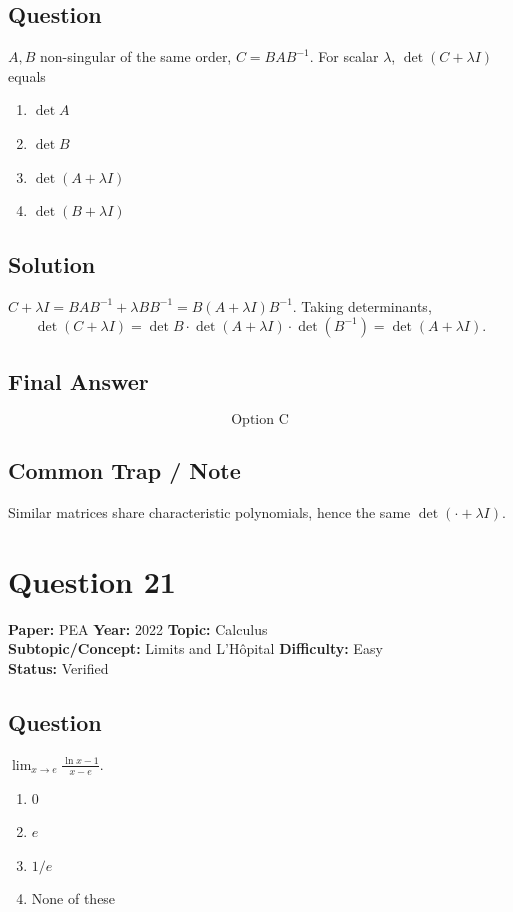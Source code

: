 \documentclass[11pt]{article}
\begin{document}
\subsection*{Question}
$A, B$ non-singular of the same order, $C = B A B^{-1}$. For scalar $\lambda$, $\det(C + \lambda I)$ equals
\begin{enumerate}[label=(\Alph*)]
\item $\det A$
\item $\det B$
\item $\det(A + \lambda I)$
\item $\det(B + \lambda I)$
\end{enumerate}

\subsection*{Solution}
$C + \lambda I = B A B^{-1} + \lambda B B^{-1} = B(A + \lambda I) B^{-1}$.
Taking determinants,
\[
\det(C + \lambda I) = \det B \cdot \det(A + \lambda I) \cdot \det(B^{-1}) = \det(A + \lambda I).
\]

\subsection*{Final Answer}
\[
\boxed{\text{Option C}}
\]

\subsection*{Common Trap / Note}
Similar matrices share characteristic polynomials, hence the same $\det(\cdot + \lambda I)$.

\section*{Question 21}
\textbf{Paper:} PEA \quad \textbf{Year:} 2022 \quad \textbf{Topic:} Calculus \\
\textbf{Subtopic/Concept:} Limits and L'H\^opital \quad \textbf{Difficulty:} Easy \\
\textbf{Status:} Verified

\subsection*{Question}
$\displaystyle \lim_{x \to e} \frac{\ln x - 1}{x - e}$.
\begin{enumerate}[label=(\Alph*)]
\item $0$
\item $e$
\item $1/e$
\item None of these
\end{enumerate}
\end{document}
